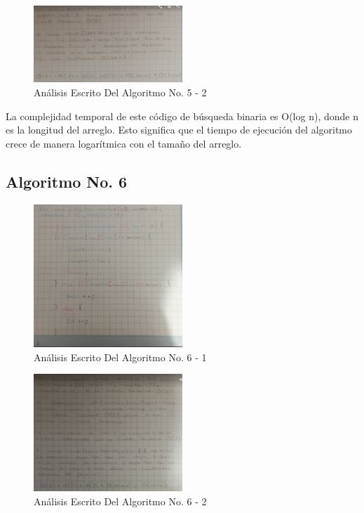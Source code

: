 \documentclass[journal, spanish]{IEEEtran}
\begin{document}
\begin{figure}[H]
  \centering
  \includegraphics[width=0.5\textwidth]{images/Captura de pantalla 2023-09-13 033555.png}
  \caption{Análisis Escrito Del Algoritmo No. 5 - 2}
  \label{fig:nombre_de_tu_imagen}
\end{figure}

La complejidad temporal de este código de búsqueda binaria es O(log n), donde n es la longitud del arreglo. Esto significa que el tiempo de ejecución del algoritmo crece de manera logarítmica con el tamaño del arreglo.

\subsection{Algoritmo No. 6}

\begin{figure}[H]
  \centering
  \includegraphics[width=0.5\textwidth]{images/Captura de pantalla 2023-09-13 033809.png}
  \caption{Análisis Escrito Del Algoritmo No. 6 - 1}
  \label{fig:nombre_de_tu_imagen}
\end{figure}

\begin{figure}[H]
  \centering
  \includegraphics[width=0.5\textwidth]{images/Captura de pantalla 2023-09-13 033825.png}
  \caption{Análisis Escrito Del Algoritmo No. 6 - 2}
  \label{fig:nombre_de_tu_imagen}
\end{figure}
\end{document}
